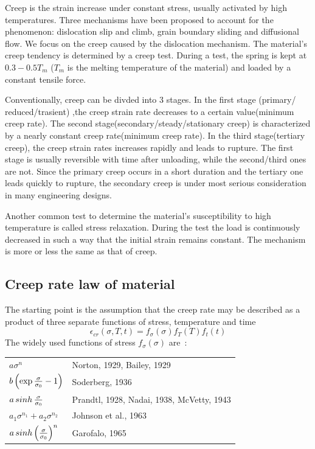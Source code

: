\documentclass[10pt]{article}
\begin{document}
Creep is the strain increase under constant stress, usually activated by high temperatures. Three mechanisms have been proposed to account for the phenomenon: dislocation slip and climb, grain boundary sliding and diffusional flow. We focus on the creep caused by the dislocation mechanism. The material's creep tendency is determined by a creep test. During a test, the spring is kept at $0.3-0.5T_m$ ($T_m$ is the melting temperature of the material) and loaded by a constant tensile force.

Conventionally, creep can be divded into $3$ stages. In the first stage (primary/ reduced/trasient) ,the creep strain rate decreases to a certain value(minimum creep rate). The second stage(secondary/steady/stationary creep) is characterized by a nearly constant creep rate(minimum creep rate). In the third stage(tertiary creep), the creep strain rates increases rapidly and leads to rupture. The first stage is usually reversible with time after unloading, while the second/third ones are not. Since the primary creep occurs in a short duration and the tertiary one leads quickly to rupture, the secondary creep is under most serious consideration in many engineering designs.

Another common test to determine the material's susceptibility to high temperature is called stress relaxation. During the test the load is continuously decreased in such a way that the initial strain remains constant. The mechanism is more or less the same as that of creep.

\subsection{Creep rate law of material}
\label{sec:Creep}
The starting point is the assumption that the creep rate may be described as a product of three separate functions of stress, temperature and time
\[
\epsilon_{cr}(\sigma,T,t)=f_\sigma (\sigma) f_T(T) f_t(t)
\]
The widely used functions of stress $f_\sigma(\sigma)$ are~\cite{Creep}:

\begin{tabular}{ll}
$a\sigma^n$ & Norton, 1929, Bailey, 1929 \\
$b\left( \exp{\sigma\over \sigma_0} -1 \right)$ & Soderberg, 1936 \\
$a\mathop{sinh}{\sigma\over \sigma_0}$ & Prandtl, 1928, Nadai, 1938, McVetty, 1943\\
$a_1\sigma^{n_1} + a_2 \sigma^{n_2}$ & Johnson et al., 1963 \\
$a\mathop{sinh} \left( {\sigma\over \sigma_0}\right)^n$ & Garofalo, 1965
\end{tabular}
\end{document}
